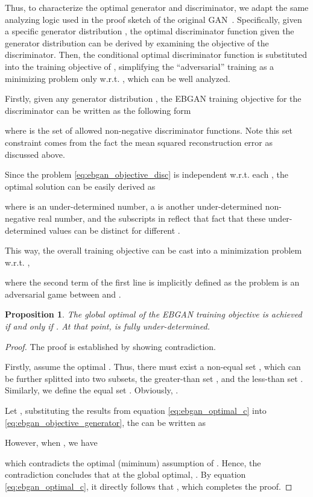 \documentclass[a4paper]{article}
\newtheorem{proposition}{Proposition}[section]
\begin{document}
Thus, to characterize the optimal generator and discriminator, we adapt the same analyzing logic used in the proof sketch of the original GAN~\citep{goodfellow2014generative}.
Specifically, given a specific generator distribution , the optimal discriminator function given the generator distribution  can be derived by examining the objective of the discriminator.
Then, the conditional optimal discriminator function is substituted into the training objective of , simplifying the ``adversarial'' training as a minimizing problem only w.r.t. , which can be well analyzed.

Firstly, given any generator distribution , the EBGAN training objective for the discriminator can be written as the following form

where  is the set of allowed non-negative discriminator functions.
Note this set constraint comes from the fact the mean squared reconstruction error as discussed above.

Since the problem \eqref{eq:ebgan_objective_disc} is independent w.r.t. each , the optimal solution can be easily derived as

where  is an under-determined number, a  is another under-determined non-negative real number, and the subscripts in  reflect that fact that these under-determined values can be distinct for different .

This way, the overall training objective can be cast into a minimization problem w.r.t. ,

where the second term of the first line is implicitly defined as the problem is an adversarial game between  and .

\begin{proposition}
The global optimal of the EBGAN training objective is achieved if and only if . At that point,  is fully under-determined.
\end{proposition}

\begin{proof}

The proof is established by showing contradiction. 

Firstly, assume the optimal . 
Thus, there must exist a non-equal set , which can be further splitted into two subsets, 
the greater-than set ,
and the less-than set .
Similarly, we define the equal set .
Obviously, .

Let , substituting the results from equation \eqref{eq:ebgan_optimal_c} into \eqref{eq:ebgan_objective_generator}, the  can be written as


However, when , we have

which contradicts the optimal (miminum) assumption of .
Hence, the contradiction concludes that at the global optimal, .
By equation \eqref{eq:ebgan_optimal_c}, it directly follows that ,
which completes the proof.
\end{proof}
\end{document}
